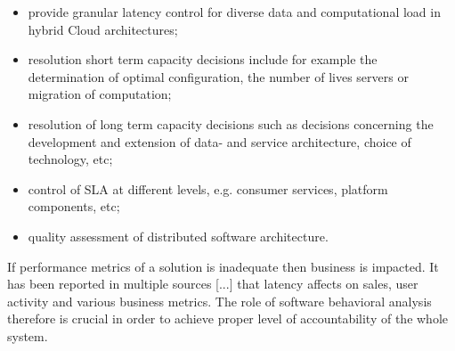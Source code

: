 \begin{itemize}
\item provide granular latency control for diverse data and computational load in hybrid Cloud architectures;
\item resolution short term capacity decisions include for example the determination of optimal configuration, the number of lives servers or migration of computation;
\item resolution of long term capacity decisions such as decisions concerning the development and extension of data- and service architecture, choice of technology, etc;
\item control of SLA at different levels, e.g. consumer services, platform components, etc;
\item quality assessment of distributed software architecture.
\end{itemize}

If performance metrics of a solution is inadequate then business is impacted. It has been reported in multiple sources [...] that latency affects on sales, user activity and various business metrics. The role of software behavioral analysis therefore is crucial in order to achieve proper level of accountability of the whole system.


